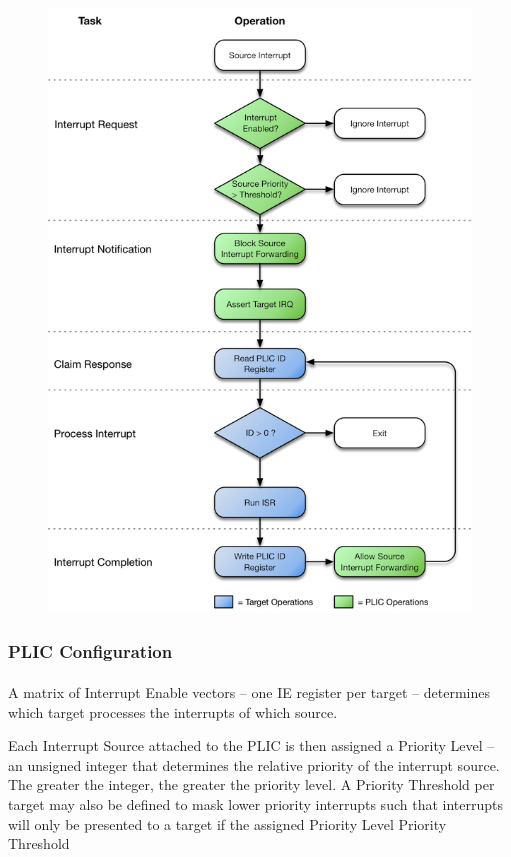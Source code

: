 \documentclass[]{article}
\begin{document}
\begin{figure}[h]
\centering
\includegraphics{../assets/graphics/AHB-Lite_PLIC_Handshake.png}
\caption{}
\end{figure}

\subsubsection{PLIC Configuration}

\paragraph{}

A matrix of Interrupt Enable vectors -- one IE register per target --
determines which target processes the interrupts of which source.

Each Interrupt Source attached to the PLIC is then assigned a Priority
Level -- an unsigned integer that determines the relative priority of
the interrupt source. The greater the integer, the greater the priority
level. A Priority Threshold per target may also be defined to mask lower
priority interrupts such that interrupts will only be presented to a
target if the assigned Priority Level Priority Threshold
\end{document}
